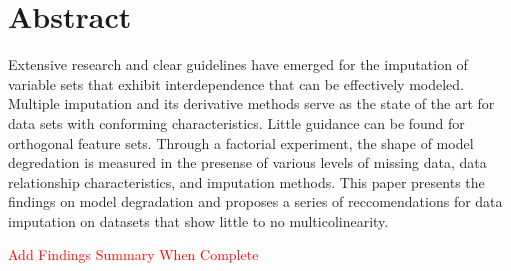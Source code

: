 \documentclass[../paper.tex]{subfiles}
\begin{document}
\section{Abstract}

Extensive research and clear guidelines have emerged for the imputation
of variable sets that exhibit interdependence that can be effectively modeled.
Multiple imputation and its derivative methods serve as the state of the art for
data sets with conforming characteristics. Little guidance can be found
for orthogonal feature sets. Through a factorial experiment, the shape of model
degredation is measured in the presense of various levels of missing data,
data relationship characteristics, and imputation methods.
This paper presents the findings on model degradation and proposes a series of
reccomendations for data imputation on datasets that show little to no multicolinearity.

\textcolor{red}{Add Findings Summary When Complete} 
\end{document}
